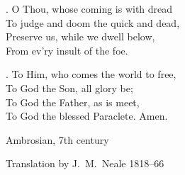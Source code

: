 {{. O Thou, whose coming is with dread\\
To judge and doom the quick and dead,\\
Preserve us, while we dwell below,\\
From ev’ry insult of the foe.

. To Him, who comes the world to free,\\
To God the Son, all glory be;\\
To God the Father, as is meet,\\
To God the blessed Paraclete. Amen.

}

}


\endlyrics

\medskip

\source Ambrosian, 7th century

\source Translation by J.~M.~Neale 1818--66

